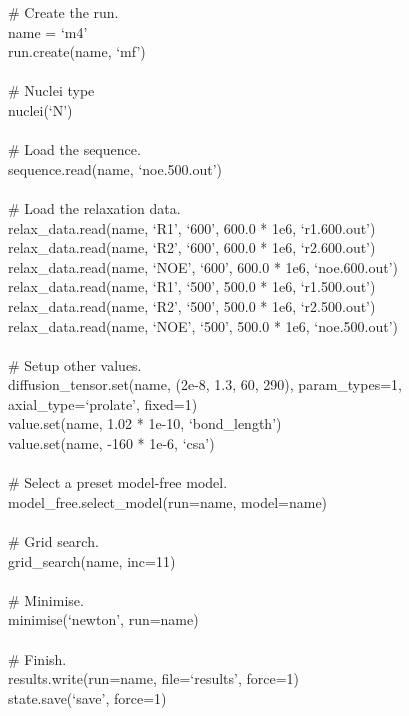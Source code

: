 \begin{exampleenv}
\# Create the run. \\
name = `m4' \\
run.create(name, `mf') \\
 \\
\# Nuclei type \\
nuclei(`N') \\
 \\
\# Load the sequence. \\
sequence.read(name, `noe.500.out') \\
 \\
\# Load the relaxation data. \\
relax\_data.read(name, `R1', `600', 600.0 * 1e6, `r1.600.out') \\
relax\_data.read(name, `R2', `600', 600.0 * 1e6, `r2.600.out') \\
relax\_data.read(name, `NOE', `600', 600.0 * 1e6, `noe.600.out') \\
relax\_data.read(name, `R1', `500', 500.0 * 1e6, `r1.500.out') \\
relax\_data.read(name, `R2', `500', 500.0 * 1e6, `r2.500.out') \\
relax\_data.read(name, `NOE', `500', 500.0 * 1e6, `noe.500.out') \\
 \\
\# Setup other values. \\
diffusion\_tensor.set(name, (2e-8, 1.3, 60, 290), param\_types=1, axial\_type=`prolate', fixed=1) \\
value.set(name, 1.02 * 1e-10, `bond\_length') \\
value.set(name, -160 * 1e-6, `csa') \\
 \\
\# Select a preset model-free model. \\
model\_free.select\_model(run=name, model=name) \\
 \\
\# Grid search. \\
grid\_search(name, inc=11) \\
 \\
\# Minimise. \\
minimise(`newton', run=name) \\
 \\
\# Finish. \\
results.write(run=name, file=`results', force=1) \\
state.save(`save', force=1) \\
\end{exampleenv}

